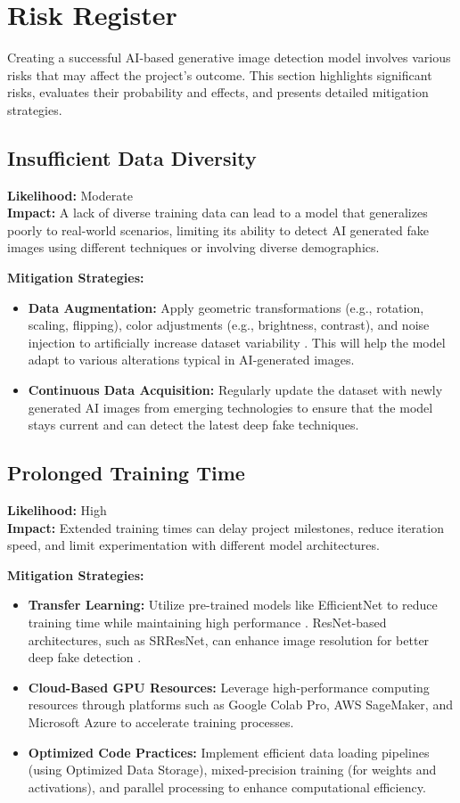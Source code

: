 \documentclass{article} %
\begin{document}
\section{Risk Register}
\label{risk}
Creating a successful AI-based generative image detection model involves various risks that may affect the project's outcome. This section highlights significant risks, evaluates their probability and effects, and presents detailed mitigation strategies.

\subsection{Insufficient Data Diversity}
\textbf{Likelihood:} Moderate \\
\textbf{Impact:} A lack of diverse training data can lead to a model that generalizes poorly to real-world scenarios, limiting its ability to detect AI generated fake images using different techniques or involving diverse demographics.

\textbf{Mitigation Strategies:}
\begin{itemize}
    \item \textbf{Data Augmentation:} Apply geometric transformations (e.g., rotation, scaling, flipping), color adjustments (e.g., brightness, contrast), and noise injection to artificially increase dataset variability \citep{shorten2019}. This will help the model adapt to various alterations typical in AI-generated images.
    \item \textbf{Continuous Data Acquisition:} Regularly update the dataset with newly generated AI images from emerging technologies to ensure that the model stays current and can detect the latest deep fake techniques.
\end{itemize}

\subsection{Prolonged Training Time}
\textbf{Likelihood:} High \\
\textbf{Impact:} Extended training times can delay project milestones, reduce iteration speed, and limit experimentation with different model architectures.

\textbf{Mitigation Strategies:}
\begin{itemize}
    \item \textbf{Transfer Learning:} Utilize pre-trained models like EfficientNet to reduce training time while maintaining high performance \citep{tan2019}. ResNet-based architectures, such as SRResNet, can enhance image resolution for better deep fake detection \citep{ledig2017}.
    \item \textbf{Cloud-Based GPU Resources:} Leverage high-performance computing resources through platforms such as Google Colab Pro, AWS SageMaker, and Microsoft Azure to accelerate training processes.
    \item \textbf{Optimized Code Practices:} Implement efficient data loading pipelines (using Optimized Data Storage), mixed-precision training (for weights and activations), and parallel processing to enhance computational efficiency.
\end{itemize}
\end{document}
